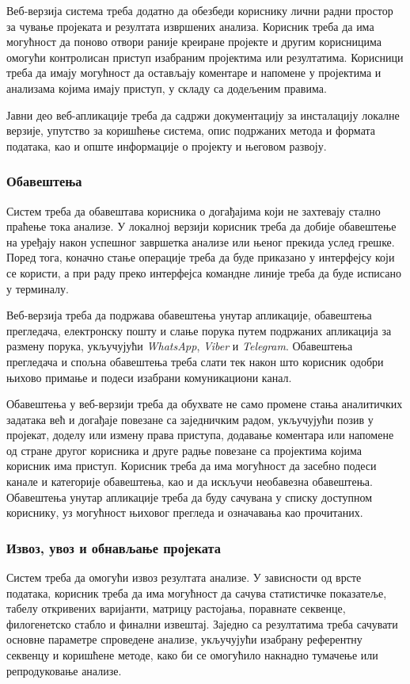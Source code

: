 \documentclass[12pt,oneside]{memoir}
\begin{document}
Веб-верзија система треба додатно да обезбеди кориснику лични радни простор за чување пројеката и резултата извршених анализа. Корисник треба да има могућност да поново отвори раније креиране пројекте и другим корисницима омогући контролисан приступ изабраним пројектима или резултатима. Корисници треба да имају могућност да остављају коментаре и напомене у пројектима и анализама којима имају приступ, у складу са додељеним правима.

Јавни део веб-апликације треба да садржи документацију за инсталацију локалне верзије, упутство за коришћење система, опис подржаних метода и формата података, као и опште информације о пројекту и његовом развоју.


\subsubsection{Обавештења}
Систем треба да обавештава корисника о догађајима који не захтевају стално праћење тока анализе. У локалној верзији корисник треба да добије обавештење на уређају након успешног завршетка анализе или њеног прекида услед грешке. Поред тога, коначно стање операције треба да буде приказано у интерфејсу који се користи, а при раду преко интерфејса командне линије треба да буде исписано у терминалу.

Веб-верзија треба да подржава обавештења унутар апликације, обавештења прегледача, електронску пошту и слање порука путем подржаних апликација за размену порука, укључујући \textit{WhatsApp}, \textit{Viber} и \textit{Telegram}. Обавештења прегледача и спољна обавештења треба слати тек након што корисник одобри њихово примање и подеси изабрани комуникациони канал.

Обавештења у веб-верзији треба да обухвате не само промене стања аналитичких задатака већ и догађаје повезане са заједничким радом, укључујући позив у пројекат, доделу или измену права приступа, додавање коментара или напомене од стране другог корисника и друге радње повезане са пројектима којима корисник има приступ. Корисник треба да има могућност да засебно подеси канале и категорије обавештења, као и да искључи необавезна обавештења. Обавештења унутар апликације треба да буду сачувана у списку доступном кориснику, уз могућност њиховог прегледа и означавања као прочитаних.


\subsubsection{Извоз, увоз и обнављање пројеката}
Систем треба да омогући извоз резултата анализе. У зависности од врсте података, корисник треба да има могућност да сачува статистичке показатеље, табелу откривених варијанти, матрицу растојања, поравнате секвенце, филогенетско стабло и финални извештај. Заједно са резултатима треба сачувати основне параметре спроведене анализе, укључујући изабрану референтну секвенцу и коришћене методе, како би се омогућило накнадно тумачење или репродуковање анализе.
\end{document}
